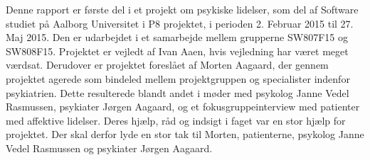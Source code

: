 Denne rapport er første del i et projekt om psykiske lidelser, som del af Software studiet på Aalborg Universitet i P8 projektet, i perioden 2. Februar 2015 til 27. Maj 2015. 
Den er udarbejdet i et samarbejde mellem grupperne SW807F15 og SW808F15.
Projektet er vejledt af Ivan Aaen, hvis vejledning har været meget værdsat.
Derudover er projektet foreslået af Morten Aagaard, der gennem projektet agerede som bindeled mellem projektgruppen og specialister indenfor psykiatrien.
Dette resulterede blandt andet i møder med psykolog Janne Vedel Rasmussen, psykiater Jørgen Aagaard, og et fokusgruppeinterview med patienter med affektive lidelser.
Deres hjælp, råd og indsigt i faget var en stor hjælp for projektet.
Der skal derfor lyde en stor tak til Morten, patienterne, psykolog Janne Vedel Rasmussen og psykiater Jørgen Aagaard.
